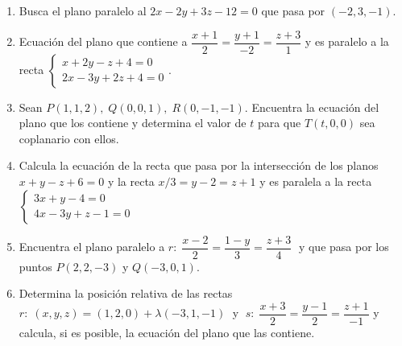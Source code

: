 \begin{enumerate}
\item Busca el plano paralelo al $2x-2y+3z-12=0$ que pasa por $(-2,3,-1)$.
 
\vspace{2mm} 

\item Ecuación del plano que contiene a $\dfrac{x+1}{2}=\dfrac{y+1}{-2}=\dfrac{z+3}{1}$ y es paralelo a la recta $\begin{cases} x+2y-z+4=0\\2x-3y+2z+4=0\end{cases}$.

\vspace{2mm} 

\item Sean $P(1,1,2),\; Q(0,0,1), \; R(0,-1,-1)$. Encuentra la ecuación del plano que los contiene y determina el valor de $t$ para que $T(t,0,0)$ sea coplanario con ellos.

\vspace{2mm} 

\item Calcula la ecuación de la recta que pasa por la intersección de los planos $x+y-z+6=0$ y la recta $x/3=y-2=z+1$ y es paralela a la recta $\begin{cases} 3x+y-4=0\\4x-3y+z-1=0\end{cases}$

\vspace{2mm} 

\item  Encuentra el plano paralelo a $r:\;\dfrac{x-2}{2}=\dfrac{1-y}{3}=\dfrac{z+3}{4}\;$ y que pasa por los puntos $P(2,2,-3)$ y $Q(-3,0,1)$.

\vspace{2mm} 

\item Determina la posición relativa de las rectas $r:\; (x,y,z)=(1,2,0)+\lambda(-3,1,-1)\;$ y $\;s:\; \dfrac{x+3}{2}=\dfrac{y-1}{2}=\dfrac{z+1}{-1}$ y calcula, si es posible, la ecuación del plano que las contiene.


\end{enumerate}
